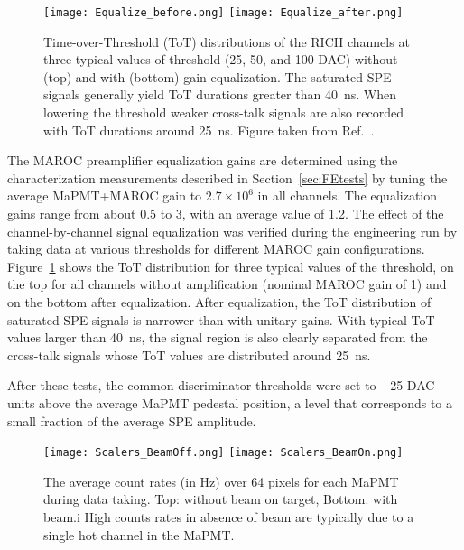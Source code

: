 \documentclass[5p,times,twocolumn]{elsarticle}
\begin{document}
\begin{figure}[t]
\begin{center}
\texttt{[image: Equalize\_before.png]}
\texttt{[image: Equalize\_after.png]}
\end{center}
\caption{Time-over-Threshold (ToT) distributions of the RICH channels at three typical values of threshold (25, 50, and 100 DAC) without (top) and with (bottom) gain equalization. The saturated SPE signals generally yield ToT durations greater than 40~ns. When lowering the threshold weaker cross-talk signals are also recorded with ToT durations around 25~ns. Figure taken from Ref.~\cite{Ref:RICHElectro}.}
\label{Fig:Equali}
\end{figure}

The MAROC preamplifier equalization gains are determined using the characterization measurements described in
Section~\ref{sec:FEtests} by tuning the average MaPMT+MAROC gain to $2.7 \times 10^6$ in all channels. The
equalization gains range from about 0.5 to 3, with an average value of 1.2. The effect of the channel-by-channel signal
equalization was verified during the engineering run by taking data at various thresholds for different MAROC gain
configurations.  Figure~\ref{Fig:Equali} shows the ToT distribution for three typical values of the threshold, on the top
for all channels without amplification (nominal MAROC gain of 1) and on the bottom after equalization. After equalization,
the ToT distribution of saturated SPE signals is narrower than with unitary gains.  With typical ToT values larger than
40~ns, the signal region is also clearly separated from the cross-talk signals whose ToT values are distributed around
25~ns.

After these tests, the common discriminator thresholds were set to +25 DAC units above the average MaPMT
pedestal position, a level that corresponds to a small fraction of the average SPE amplitude.

\begin{figure}[t]
\begin{center}
\texttt{[image: Scalers\_BeamOff.png]}
\texttt{[image: Scalers\_BeamOn.png]}
\end{center}
\caption{The average count rates (in Hz) over 64 pixels for each MaPMT during data taking. Top: without beam on
  target, Bottom: with beam.i High counts rates in absence of beam are typically due to a single hot channel in
  the MaPMT.}
\label{fig:Online_Scalers}
\end{figure}

\end{document}
